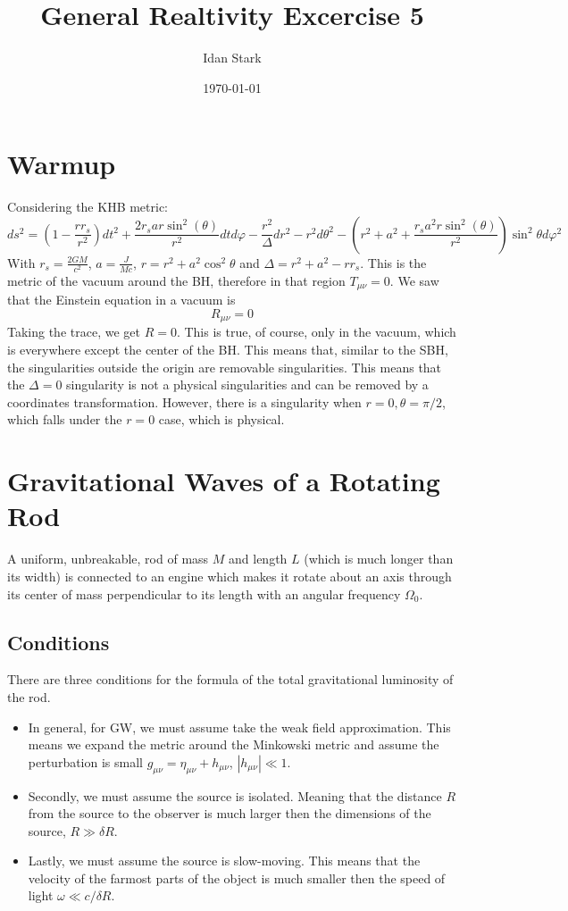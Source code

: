 \documentclass{article}
\title{General Realtivity Excercise 5}
\author{Idan Stark}
\date{\today}
\begin{document}
\maketitle
\section{Warmup}
Considering the KHB metric:
\begin{equation}
    ds^2 = \left(1 - \frac{rr_s}{r^2}\right)dt^2
    + \frac{2r_sar\sin^2(\theta)}{r^2}dtd\varphi
    - \frac{r^2}{\Delta}dr^2
    - r^2 d\theta^2
    - \left(r^2 + a^2 + \frac{r_sa^2r\sin^2(\theta)}{r^2}\right)\sin^2\theta d\varphi^2
\end{equation}
With $r_s = \frac{2GM}{c^2}$, $a = \frac{J}{Mc}$, $r = r^2 + a^2\cos^2\theta$ and $\Delta = r^2 + a^2 - rr_s$.
\newline
This is the metric of the vacuum around the BH, therefore in that region $T_{\mu\nu} = 0$. We saw that the Einstein equation in a vacuum is
\begin{equation}
    R_{\mu\nu} = 0
\end{equation}
Taking the trace, we get $R = 0$.
\newline
This is true, of course, only in the vacuum, which is everywhere except the center of the BH. This means that, similar to the SBH, the singularities outside the origin are removable singularities. This means that the $\Delta = 0$ singularity is not a physical singularities and can be removed by a coordinates transformation. However, there is a singularity when $r = 0, \theta = \pi/2$, which falls under the $r = 0$ case, which is physical.

\section{Gravitational Waves of a Rotating Rod}
A uniform, unbreakable, rod of mass $M$ and length $L$ (which is much longer than its width) is connected to an engine which makes it rotate about an axis through its center of mass perpendicular to its length with
an angular frequency $\Omega_0$.
\subsection{Conditions}
There are three conditions for the formula of the total gravitational luminosity of the rod.
\begin{itemize}
    \item In general, for GW, we must assume take the weak field approximation. This means we expand the metric around the Minkowski metric and assume the perturbation is small $g_{\mu\nu} = \eta_{\mu\nu} + h_{\mu\nu}$, $|h_{\mu\nu}| \ll 1$.
    \item Secondly, we must assume the source is isolated. Meaning that the distance $R$ from the source to the observer is much larger then the dimensions of the source, $R \gg \delta R$.
    \item Lastly, we must assume the source is slow-moving. This means that the velocity of the farmost parts of the object is much smaller then the speed of light $\omega \ll c/\delta R$.
\end{itemize}
\end{document}
